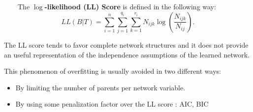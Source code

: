 ~~~~The \textbf{$\log$-likelihood (LL) Score} is defined in the following way:
$$LL(B|T)=\sum_{i=1}^{n}\sum_{j=1}^{q_{i}}\sum_{k=1}^{r_{i}}N_{ijk}\log(\frac{N_{ijk}}{N_{ij}}).$$

The LL score tends to favor complete network structures and it does not provide an useful representation of the independence assumptions of the learned network.

This phenomenon of overfitting is usually avoided in two different ways:

\begin{itemize}
	\item By limiting the number of parents per network variable.
	
	\item By using some penalization factor over the LL score : AIC, BIC
\end{itemize}